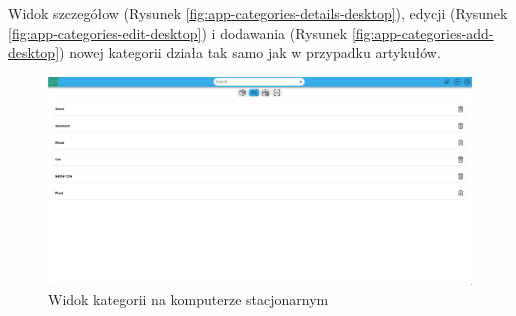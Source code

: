 \documentclass[../main.tex]{subfiles}
\begin{document}
            Widok szczegółow (Rysunek \ref{fig:app-categories-details-desktop}), edycji (Rysunek \ref{fig:app-categories-edit-desktop}) i dodawania (Rysunek \ref{fig:app-categories-add-desktop}) nowej kategorii działa tak samo jak w przypadku artykułów.

            \begin{figure}[H]
                \centering
                \includegraphics[width=\getImageWidth]{images/app-desktop/app-categories-desktop.png}
                \caption{Widok kategorii na komputerze stacjonarnym}
                \label{fig:app-categories-desktop}
            \end{figure}
\end{document}
